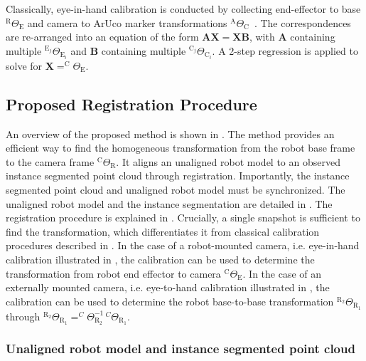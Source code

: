 Classically, eye-in-hand calibration is conducted by collecting end-effector to base $^\text{R}\Theta_\text{E}$ and camera to ArUco marker transformations $^\text{A}\Theta_\text{C}$~\citep{eye_in_hand}. The correspondences are re-arranged into an equation of the form $\mathbf{A}\mathbf{X}=\mathbf{X}\mathbf{B}$, with $\mathbf{A}$ containing multiple $^{\text{E}_j}\Theta_{\text{E}_i}$ and $\mathbf{B}$ containing multiple $^{\text{C}_j}\Theta_{\text{C}_i}$. A 2-step regression is applied to solve for $\mathbf{X}=^\text{C}\Theta_\text{E}$.

\subsection{Proposed Registration Procedure}
\label{c1:sec:proposed_calibration_procedure}
An overview of the proposed method is shown in . The method provides an efficient way to find the homogeneous transformation from the robot base frame to the camera frame $^\text{C}\Theta_\text{R}$. It aligns an unaligned robot model to an observed instance segmented point cloud through registration. Importantly, the instance segmented point cloud and unaligned robot model must be synchronized. The unaligned robot model and the instance segmentation are detailed in . The registration procedure is explained in . Crucially, a single snapshot is sufficient to find the transformation, which differentiates it from classical calibration procedures described in . In the case of a robot-mounted camera, i.e. eye-in-hand calibration illustrated in , the calibration can be used to determine the transformation from robot end effector to camera $^\text{C}\Theta_\text{E}$. In the case of an externally mounted camera, i.e. eye-to-hand calibration illustrated in , the calibration can be used to determine the robot base-to-base transformation $^{\text{R}_2}\Theta_{\text{R}_1}$ through $^{\text{R}_2}\Theta_{\text{R}_1} = ^C\Theta^{-1}_{\text{R}_2}\,^{C}\Theta_{\text{R}_1}$.

\subsubsection{Unaligned robot model and instance segmented point cloud}
\label{c1:sec:unaligned_robot_model_and_instance_segmented_point_cloud}
